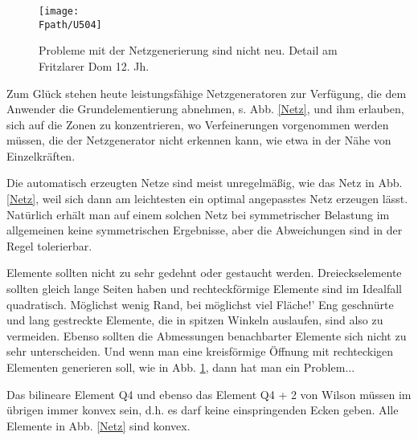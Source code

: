 {%
\begin{figure}[tbp] \centering
\if {} \sidecaption \fi
\texttt{[image: \\Fpath/U504]}
\caption{Probleme mit der Netzgenerierung sind nicht neu. Detail am Fritzlarer Dom 12. Jh.} \label{U504}
\end{figure}%

Zum Gl\"{u}ck stehen heute leistungsf\"{a}hige Netzgeneratoren zur Verf\"{u}gung, die dem Anwender die Grundelementierung abnehmen, s. Abb. \ref{Netz}, und ihm erlauben, sich auf die Zonen zu konzentrieren, wo Verfeinerungen vorgenommen werden m\"{u}ssen, die der Netzgenerator nicht erkennen kann, wie etwa in der N\"{a}he von Einzelkr\"{a}ften.

Die automatisch erzeugten Netze sind meist unregelm\"{a}{\ss}ig, wie das Netz in Abb. \ref{Netz}, weil sich dann am leichtesten ein optimal angepasstes Netz erzeugen l\"{a}sst. Nat\"{u}rlich erh\"{a}lt man auf einem solchen Netz bei symmetrischer Belastung im allgemeinen keine symmetrischen Ergebnisse, aber die Abweichungen sind in der Regel tolerierbar.

Elemente sollten nicht zu sehr gedehnt oder gestaucht werden. Dreieckselemente sollten gleich lange Seiten haben und rechteckf\"{o}rmige Elemente sind im Idealfall quadratisch. \glq M\"{o}glichst wenig Rand, bei m\"{o}glichst viel Fl\"{a}che!' Eng geschn\"{u}rte und lang gestreckte Elemente, die in spitzen Winkeln auslaufen, sind also zu vermeiden. Ebenso sollten die Abmessungen benachbarter Elemente sich nicht zu sehr unterscheiden. Und wenn man eine kreisf\"{o}rmige \"{O}ffnung mit rechteckigen Elementen generieren soll, wie in  Abb. \ref{U504}, dann hat man ein Problem...

Das bilineare Element Q4 und ebenso das Element Q4 + 2 von Wilson m\"{u}ssen im \"{u}brigen immer konvex sein, d.h. es darf keine einspringenden Ecken geben. Alle Elemente in Abb. \ref{Netz} sind konvex.


}
